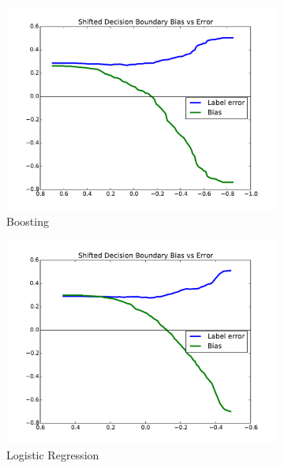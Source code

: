 \documentclass[twoside,leqno,twocolumn]{article}
\begin{document}
\begin{figure}[t]
\centering
\begin{subfigure}{.7\columnwidth}
\includegraphics[width=\columnwidth]{images/singles-boosting-T.pdf}%
\caption{Boosting}%
\label{fig:singles_boosting_tradeoff}%
\end{subfigure}%
\begin{subfigure}{.7\columnwidth}
\includegraphics[width=\columnwidth]{images/singles-lr-T.pdf}%
\caption{Logistic Regression}%
\label{fig:singles_lr_tradeoff}%
\end{subfigure}%
\begin{subfigure}{.7\columnwidth}

\end{subfigure}
\end{figure}
\end{document}
